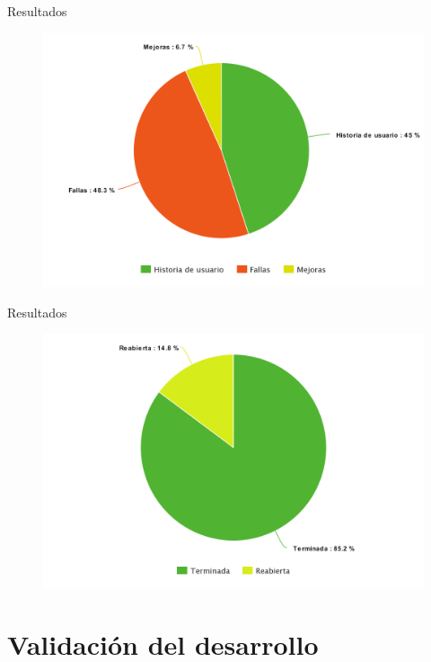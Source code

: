 \documentclass[10pt,xcolor=table ]{beamer}
\begin{document}
\begin{frame}{Resultados}
	\begin{figure}
		\centering
	    \includegraphics[scale=0.235]{../Figuras/tickets_tipo}
	\end{figure}
\end{frame}

\begin{frame}{Resultados}
	\begin{figure}
		\centering
	    \includegraphics[scale=0.235]{../Figuras/historias_cerradas_reabiertas}
	\end{figure}
\end{frame}

\section{Validación del desarrollo}
\end{document}
